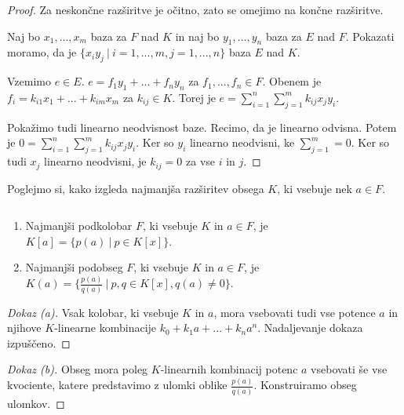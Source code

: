 \documentclass[11pt, a4paper]{article}
\begin{document}
    \begin{proof}
        Za neskončne razširitve je očitno, zato se omejimo na končne razširitve.
        \par
        Naj bo \(x_1,...,x_m\) baza za \(F\) nad \(K\) in naj bo \(y_1,...,y_n\) baza za \(E\) nad \(F\). Pokazati moramo, da je \(\{x_i y_j\ |\ i = 1,...,m, j = 1,...,n\}\) baza \(E\) nad \(K\).
        \par
        Vzemimo \(e \in E\). \(e = f_1 y_1 + ... + f_n y_n\) za \(f_1,...,f_n \in F\). Obenem je \(f_i = k_{i1} x_1 + ... + k_{im} x_m\) za \(k_{ij} \in K\). Torej je \(e = \sum_{i = 1}^n \sum_{j = 1}^m k_{ij} x_j y_i\).
        \par
        Pokažimo tudi linearno neodvisnost baze. Recimo, da je linearno odvisna. Potem je \(0 = \sum_{i = 1}^n \sum_{j = 1}^m k_{ij} x_j y_i\). Ker so \(y_i\) linearno neodvisni, ke \(\sum_{j = 1}^m = 0\). Ker so tudi \(x_j\) linearno neodvisni, je \(k_{ij} = 0\) za vse \(i\) in \(j\). 
    \end{proof}

    Poglejmo si, kako izgleda najmanjša razširitev obsega \(K\), ki vsebuje nek \(a \in F\).
    
    \begin{proposition}
        \(\)\par
        \begin{enumerate}[label=\alph*)]
            \item Najmanjši podkolobar \(F\), ki vsebuje \(K\) in \(a \in F\), je \(K[a] = \{p(a)\ |\ p \in K[x]\}\).
            \item Najmanjši podobseg \(F\), ki vsebuje \(K\) in \(a \in F\), je \(K(a) = \{\frac{p(a)}{q(a)}\ |\ p,q \in K[x], q(a) \neq 0\}\).
        \end{enumerate}
    \end{proposition}

    \begin{proof}[Dokaz \emph{(a)}]
        Vsak kolobar, ki vsebuje \(K\) in \(a\), mora vsebovati tudi vse potence \(a\) in njihove \(K\)-linearne kombinacije \(k_0 + k_1 a + ... + k_n a^n\). Nadaljevanje dokaza izpuščeno.
    \end{proof}

    \begin{proof}[Dokaz \emph{(b)}]
        Obseg mora poleg \(K\)-linearnih kombinacij potenc \(a\) vsebovati še vse kvociente, katere predstavimo z ulomki oblike \(\frac{p(a)}{q(a)}\). Konstruiramo obseg ulomkov.
    \end{proof}
\end{document}
